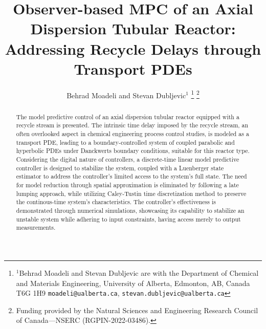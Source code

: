 \documentclass[letterpaper, 10 pt, conference]{ieeeconf}  %
\title{\LARGE \bf
Observer-based MPC of an Axial Dispersion Tubular Reactor:\\ Addressing Recycle Delays through Transport PDEs
}
\author{Behrad Moadeli and Stevan Dubljevic$^{1}$%
\thanks{$^{1}$Behrad Moadeli and Stevan Dubljevic are with the Department of Chemical and Materials Engineering,
University of Alberta, Edmonton, AB, Canada T6G 1H9
{\tt\small moadeli@ualberta.ca}, {\tt\small stevan.dubljevic@ualberta.ca}}%
\thanks{Funding provided by the Natural Sciences and Engineering Research Council of Canada—NSERC (RGPIN-2022-03486).}%
}
\begin{document}
\maketitle
\thispagestyle{empty}
\pagestyle{empty}


\begin{abstract}

        The model predictive control of an axial dispersion tubular reactor equipped with a recycle stream is presented. The intrinsic time delay imposed by the recycle stream, an often overlooked aspect in chemical engineering process control studies, is modeled as a transport PDE, leading to a boundary-controlled system of coupled parabolic and hyperbolic PDEs under Danckwerts boundary conditions, suitable for this reactor type. Considering the digital nature of controllers, a discrete-time linear model predictive controller is designed to stabilize the system, coupled with a Luenberger state estimator to address the controller's limited access to the system's full state. The need for model reduction through spatial approximation is eliminated by following a late lumping approach, while utilizing Caley-Tustin time discretization method to preserve the continous-time system's characteristics. The controller's effectiveness is demonstrated through numerical simulations, showcasing its capability to stabilize an unstable system while adhering to input constraints, having access merely to output measurements.

\end{abstract}





% 
% 

\balance

\end{document}
